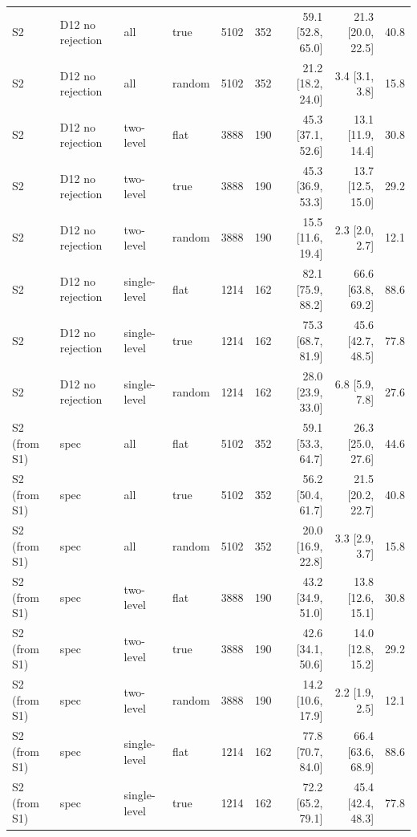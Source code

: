 \begin{tabular}{llllrrrrr}
S2 & D12 no rejection & all & true & 5102 & 352 & 59.1 \scriptsize{[52.8, 65.0]} & 21.3 \scriptsize{[20.0, 22.5]} & 40.8 \\
S2 & D12 no rejection & all & random & 5102 & 352 & 21.2 \scriptsize{[18.2, 24.0]} & 3.4 \scriptsize{[3.1, 3.8]} & 15.8 \\
S2 & D12 no rejection & two-level & flat & 3888 & 190 & 45.3 \scriptsize{[37.1, 52.6]} & 13.1 \scriptsize{[11.9, 14.4]} & 30.8 \\
S2 & D12 no rejection & two-level & true & 3888 & 190 & 45.3 \scriptsize{[36.9, 53.3]} & 13.7 \scriptsize{[12.5, 15.0]} & 29.2 \\
S2 & D12 no rejection & two-level & random & 3888 & 190 & 15.5 \scriptsize{[11.6, 19.4]} & 2.3 \scriptsize{[2.0, 2.7]} & 12.1 \\
S2 & D12 no rejection & single-level & flat & 1214 & 162 & 82.1 \scriptsize{[75.9, 88.2]} & 66.6 \scriptsize{[63.8, 69.2]} & 88.6 \\
S2 & D12 no rejection & single-level & true & 1214 & 162 & 75.3 \scriptsize{[68.7, 81.9]} & 45.6 \scriptsize{[42.7, 48.5]} & 77.8 \\
S2 & D12 no rejection & single-level & random & 1214 & 162 & 28.0 \scriptsize{[23.9, 33.0]} & 6.8 \scriptsize{[5.9, 7.8]} & 27.6 \\
\midrule
S2 (from S1) & spec & all & flat & 5102 & 352 & 59.1 \scriptsize{[53.3, 64.7]} & 26.3 \scriptsize{[25.0, 27.6]} & 44.6 \\
S2 (from S1) & spec & all & true & 5102 & 352 & 56.2 \scriptsize{[50.4, 61.7]} & 21.5 \scriptsize{[20.2, 22.7]} & 40.8 \\
S2 (from S1) & spec & all & random & 5102 & 352 & 20.0 \scriptsize{[16.9, 22.8]} & 3.3 \scriptsize{[2.9, 3.7]} & 15.8 \\
S2 (from S1) & spec & two-level & flat & 3888 & 190 & 43.2 \scriptsize{[34.9, 51.0]} & 13.8 \scriptsize{[12.6, 15.1]} & 30.8 \\
S2 (from S1) & spec & two-level & true & 3888 & 190 & 42.6 \scriptsize{[34.1, 50.6]} & 14.0 \scriptsize{[12.8, 15.2]} & 29.2 \\
S2 (from S1) & spec & two-level & random & 3888 & 190 & 14.2 \scriptsize{[10.6, 17.9]} & 2.2 \scriptsize{[1.9, 2.5]} & 12.1 \\
S2 (from S1) & spec & single-level & flat & 1214 & 162 & 77.8 \scriptsize{[70.7, 84.0]} & 66.4 \scriptsize{[63.6, 68.9]} & 88.6 \\
S2 (from S1) & spec & single-level & true & 1214 & 162 & 72.2 \scriptsize{[65.2, 79.1]} & 45.4 \scriptsize{[42.4, 48.3]} & 77.8 \\

\end{tabular}
